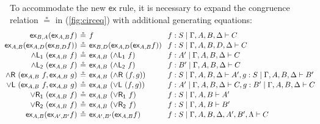 \documentclass[submission,copyright,creativecommons]{eptcs}
\theoremstyle{definition}
\newcommand{\tl}{\otimes \mathsf{L}}
\newcommand{\tr}{\otimes \mathsf{R}}
\newcommand{\pass}{\mathsf{pass}}
\newcommand{\unitl}{\mathsf{IL}}
\newcommand{\andlone}{\land \mathsf{L_{1}}}
\newcommand{\andltwo}{\land \mathsf{L_{2}}}
\newcommand{\andr}{\land \mathsf{R}}
\newcommand{\orl}{\lor \mathsf{L}}
\newcommand{\orrone}{\lor \mathsf{R_{1}}}
\newcommand{\orrtwo}{\lor \mathsf{R_{2}}}
\newcommand{\ex}{\mathsf{ex}}
\begin{document}
To accommodate the new $\ex$ rule, it is necessary to expand the congruence relation $\circeq$ in (\ref{fig:circeq}) with additional generating equations:
\begin{equation}\label{fig:circeq:sym}
  \arraycolsep=2pt
  \def\arraystretch{1.1}
  \hspace{-8.9pt}
\begin{array}{rclll}
\ex_{B , A}  (\ex_{A , B}  f) &\circeq & f &&f: S \mid \Gamma , A , B , \Delta \vdash C
\\
\ex_{A , B}  (\ex_{A , D}  (\ex_{B , D}  f)) &\circeq & \ex_{B , D}  (\ex_{A , D}  (\ex_{A , B}  f)) &&f : S \mid \Gamma , A , B , D , \Delta \vdash C 
\\
  \andlone \ (\ex_{A , B} \ f) &\circeq &\ex_{A , B} \ (\andlone \ f) &&f : A' \mid \Gamma , A , B , \Delta \vdash C
  \\
  \andltwo \ (\ex_{A , B} \ f) &\circeq &\ex_{A , B} \ (\andltwo \ f) &&f : B' \mid \Gamma , A , B , \Delta \vdash C
  \\
  \andr \ (\ex_{A , B} \ f , \ex_{A , B} \ g) &\circeq &\ex_{A , B} \ (\andr \ (f , g)) &&f : S \mid \Gamma , A , B , \Delta \vdash A' , g : S \mid \Gamma , A , B , \Delta \vdash B'
  \\
  \orl \ (\ex_{A , B} \ f , \ex_{A , B} \ g) &\circeq &\ex_{A , B} \ (\orl \ (f , g)) &&f : A' \mid \Gamma , A , B , \Delta \vdash C ,  g : B' \mid \Gamma , A , B , \Delta \vdash C
  \\
  \orrone \ (\ex_{A , B} \ f) &\circeq &\ex_{A , B} \ (\orrone \ f) &&f : S \mid \Gamma , A , B \vdash A'
  \\
  \orrtwo \ (\ex_{A , B} \ f) &\circeq &\ex_{A , B} \ (\orrtwo \ f) &&f : S \mid \Gamma , A , B \vdash B'
  \\
  \ex_{A , B}  (\ex_{A' , B'}  f) &\circeq & \ex_{A' , B'}  (\ex_{A , B}  f) &&f: S \mid \Gamma , A , B , \Delta , A' , B' , \Lambda \vdash C	
\end{array}
\end{equation}
\end{document}
